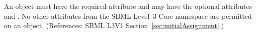 An \InitialAssignment object must have the required attribute
 and may have the optional attributes   and
.  No other attributes from the SBML Level~3 Core namespace
are permitted on an \InitialAssignment object.  (References: SBML L3V1
Section~\ref{sec:initialAssignment}.)
